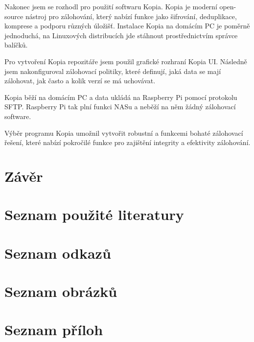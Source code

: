 \documentclass[a4paper,12pt, oneside]{book}
\begin{document}
Nakonec jsem se rozhodl pro použití softwaru Kopia. Kopia je moderní open-source
nástroj pro zálohování, který nabízí funkce jako šifrování, deduplikace,
komprese a podporu různých úložišť. Instalace Kopia na domácím PC je poměrně jednoduchá, na Linuxových 
distribucích jde stáhnout prostřednictvím správce balíčků.

Pro vytvoření Kopia repozitáře jsem použil grafické rozhraní Kopia UI.
Následně jsem nakonfiguroval zálohovací politiky, které
definují, jaká data se mají zálohovat, jak často a kolik verzí se má uchovávat.

Kopia běží na domácím PC a data ukládá na Raspberry Pi pomocí protokolu SFTP.
Raspberry Pi tak plní funkci NASu a neběží na něm žádný zálohovací software.

Výběr programu Kopia umožnil vytvořit robustní a funkcemi bohaté zálohovací
řešení, které nabízí pokročilé funkce pro zajištění integrity a efektivity
zálohování.  










\chapter{Závěr}


\chapter{Seznam použité literatury}

\chapter{Seznam odkazů}



\chapter{Seznam obrázků}
\listoffigures


\chapter{Seznam příloh}
\end{document}
